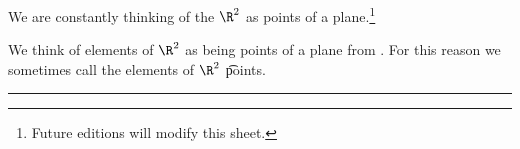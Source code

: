 

We are constantly thinking of the $\R^2$ as points of a plane.\footnote{Future editions will modify this sheet.}


We think of elements of $\R^2$ as being points of a plane from .
For this reason we sometimes call the elements of $\R^2$ \t{points}.
\par\noindent\rule{\textwidth}{1cm}

\blankpage
